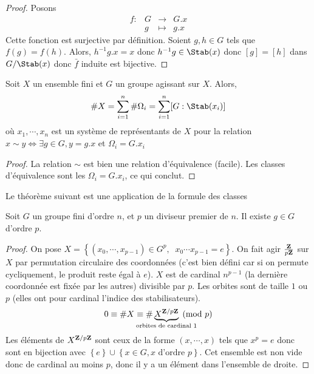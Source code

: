 \begin{proof}
Posons \[
\begin{array}{rrcl}
    f:&G  & \longrightarrow &G.x  \\
    & g & \longmapsto & \displaystyle g.x 
\end{array}
\] 
Cette fonction est surjective par définition. Soient $g, h \in  G$ tels que $f(g)=f(h)$. Alors,  $h^{-1}g.x=x$ donc $h^{-1}g \in  \Stab(x)$ donc $[g]=[h]$ dans  $G / \Stab(x)$ donc  $\bar{f}$ induite est bijective.
\end{proof}

\begin{thm}
    Soit $X$ un ensemble fini et  $G$ un groupe agissant sur $X$. Alors,  \[
        \# X = \sum_{i=1}^n \#\Omega_i = \sum_{i=1}^n [G : \Stab(x_i)]
    \] 
    où $x_1, \cdots , x_n$ est un système de représentants de $X$ pour la relation  $x\sim y \iff  \exists  g \in  G, y=g.x$ et $\Omega_i=G.x_i$
\end{thm}

\begin{proof}
    La relation $\sim$ est bien une relation d'équivalence (facile). Les classes d'équivalence sont les $\Omega_i=G.x_i$, ce qui conclut.
\end{proof}

Le théorème suivant est une application de la formule des classes

\begin{thm}
Soit $G$ un groupe fini d'ordre  $n$, et  $p$ un diviseur premier de  $n$. Il existe  $g \in  G$ d'ordre $p$.
\end{thm}

\begin{proof}
    On pose $X = \left\{ (x_0, \cdots , x_{p-1}) \in  G^p, \;\; x_0\cdots x_{p-1}=e \right\} $. On fait agir $\frac{\mathbf Z}{p\mathbf Z}$ sur $X$ par permutation circulaire des coordonnées (c'est bien défini car si on permute cycliquement, le produit reste égal à $e$). $X$ est de cardinal  $n^{p-1}$ (la dernière coordonnée est fixée par les autres) divisible par  $p$. Les orbites sont de taille  $1$ ou  $p$ (elles ont pour cardinal l'indice des stabilisateurs).  \[
        0\equiv \#X \equiv \#\underbrace{X^{\Z / p\Z}}_{\mathclap{\text{orbites de cardinal } 1}}\pmod p
    \] 
    Les éléments de $X^{\mathbf Z / p\mathbf Z}$ sont ceux de la forme $(x, \cdots , x)$ tels que $x^p=e$ donc sont en bijection avec  $\left\{ e \right\} \cup \left\{ x \in  G, x\text{ d'ordre  } p\right\} $. Cet ensemble est non vide donc de cardinal au moins $p$, donc il y a un élément dans l'ensemble de droite.
\end{proof}

